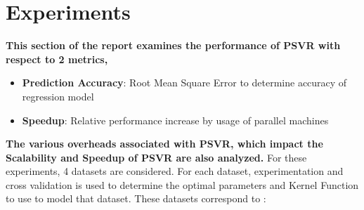 \documentclass[12pt]{article}
\begin{document}
\section{Experiments}
{\bf This section of the report examines the performance of PSVR with respect to 2 metrics,}
\begin{itemize}
\item  {\bf Prediction Accuracy}: Root Mean Square Error to determine accuracy of regression model
\item {\bf Speedup}: Relative performance increase by usage of parallel machines
\end{itemize}
{\bf The various overheads associated with PSVR, which impact the Scalability and Speedup of PSVR are also analyzed.}
\newline\newline
For these experiments, 4 datasets are considered. For each dataset, experimentation and cross validation is used to determine the optimal parameters and Kernel Function to use to model that dataset. These datasets correspond to : 
\end{document}
